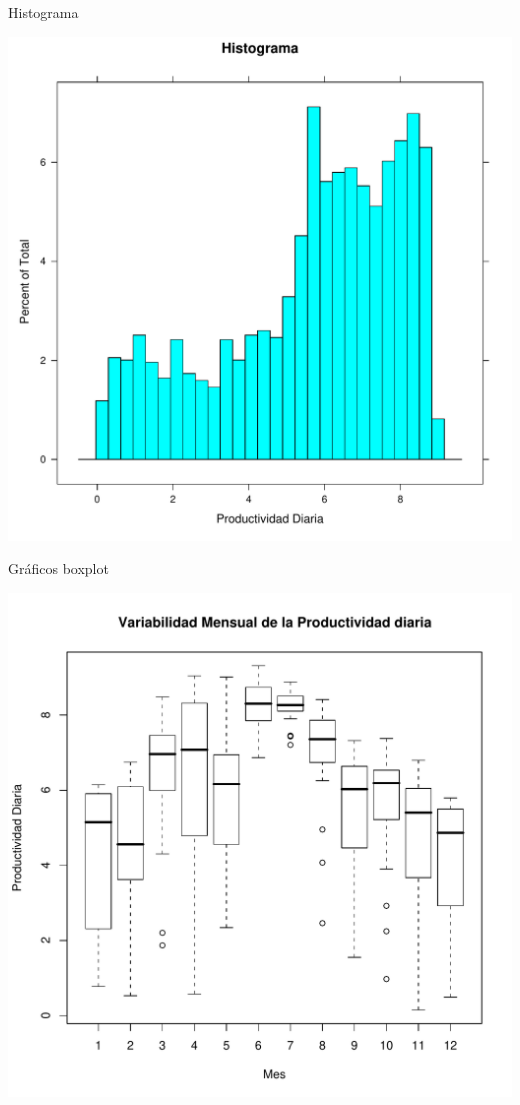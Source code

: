 \documentclass[xcolor={usenames,svgnames,dvipsnames}]{beamer}
\begin{document}
\begin{frame}[label={sec:orgf8d418c}]{Histograma}
\begin{center}
\includegraphics[width=.9\linewidth]{../figs/Histograma.pdf}
\end{center}
\end{frame}


\begin{frame}[label={sec:orgf48fc89}]{Gráficos boxplot}
\begin{center}
\includegraphics[width=.9\linewidth]{../figs/GraficoBoxplot.pdf}
\end{center}
\end{frame}
\end{document}
